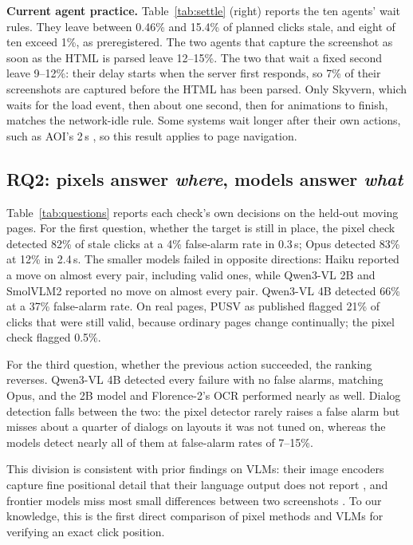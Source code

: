 \documentclass[10pt]{article}
\begin{document}
\textbf{Current agent practice.} Table~\ref{tab:settle} (right) reports the ten agents' wait rules. They leave between 0.46\% and 15.4\% of planned clicks stale, and eight of ten exceed 1\%, as preregistered. The two agents that capture the screenshot as soon as the HTML is parsed leave 12--15\%. The two that wait a fixed second leave 9--12\%: their delay starts when the server first responds, so 7\% of their screenshots are captured before the HTML has been parsed. Only Skyvern, which waits for the load event, then about one second, then for animations to finish, matches the network-idle rule. Some systems wait longer after their own actions, such as AOI's 2\,s \citep{aoi}, so this result applies to page navigation.

\subsection{RQ2: pixels answer \emph{where}, models answer \emph{what}}
\label{sec:where}

Table~\ref{tab:questions} reports each check's own decisions on the held-out moving pages. For the first question, whether the target is still in place, the pixel check detected 82\% of stale clicks at a 4\% false-alarm rate in 0.3\,s; Opus detected 83\% at 12\% in 2.4\,s. The smaller models failed in opposite directions: Haiku reported a move on almost every pair, including valid ones, while Qwen3-VL 2B and SmolVLM2 reported no move on almost every pair. Qwen3-VL 4B detected 66\% at a 37\% false-alarm rate. On real pages, PUSV as published flagged 21\% of clicks that were still valid, because ordinary pages change continually; the pixel check flagged 0.5\%.

For the third question, whether the previous action succeeded, the ranking reverses. Qwen3-VL 4B detected every failure with no false alarms, matching Opus, and the 2B model and Florence-2's OCR performed nearly as well. Dialog detection falls between the two: the pixel detector rarely raises a false alarm but misses about a quarter of dialogs on layouts it was not tuned on, whereas the models detect nearly all of them at false-alarm rates of 7--15\%.

This division is consistent with prior findings on VLMs: their image encoders capture fine positional detail that their language output does not report \citep{blindtest}, and frontier models miss most small differences between two screenshots \citep{diffspot}. To our knowledge, this is the first direct comparison of pixel methods and VLMs for verifying an exact click position.
\end{document}
